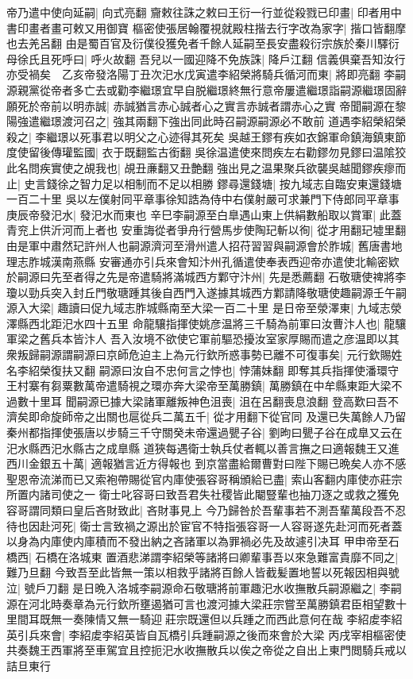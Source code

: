 帝乃遣中使向延嗣|{
	向式亮翻}
齎敕往誅之敕曰王衍一行並從殺戮已印畫|{
	印者用中書印畫者畫可敕又用御寶}
樞密使張居翰覆視就殿柱揩去行字改為家字|{
	揩口皆翻摩也去羌呂翻}
由是蜀百官及衍僕役獲免者千餘人延嗣至長安盡殺衍宗族於秦川驛衍母徐氏且死呼曰|{
	呼火故翻}
吾兒以一國迎降不免族誅|{
	降戶江翻}
信義俱棄吾知汝行亦受禍矣　乙亥帝發洛陽丁丑次汜水戊寅遣李紹榮將騎兵循河而東|{
	將即亮翻}
李嗣源親黨從帝者多亡去或勸李繼璟宜早自脱繼璟終無行意帝屢遣繼璟詣嗣源繼璟固辭願死於帝前以明赤誠|{
	赤誠猶言赤心誠者心之實言赤誠者謂赤心之實}
帝聞嗣源在黎陽強遣繼璟渡河召之|{
	強其兩翻下強出同此時召嗣源嗣源必不敢前}
道遇李紹榮紹榮殺之|{
	李繼璟以死事君以明父之心迹得其死矣}
吳越王鏐有疾如衣錦軍命鎮海鎮東節度使留後傳瓘監國|{
	衣于既翻監古銜翻}
吳徐温遣使來問疾左右勸鏐勿見鏐曰温隂狡此名問疾實使之覘我也|{
	覘丑亷翻又丑艶翻}
強出見之温果聚兵欲襲吳越聞鏐疾瘳而止|{
	史言錢徐之智力足以相制而不足以相勝}
鏐尋還錢塘|{
	按九域志自臨安東還錢塘一百二十里}
吳以左僕射同平章事徐知誥為侍中右僕射嚴可求兼門下侍郎同平章事　庚辰帝發汜水|{
	發汜水而東也}
辛巳李嗣源至白臯遇山東上供絹數船取以賞軍|{
	此蓋青兖上供沂河而上者也}
安重誨從者爭舟行營馬步使陶玘斬以徇|{
	從才用翻玘墟里翻}
由是軍中肅然玘許州人也嗣源濟河至滑州遣人招苻習習與嗣源會於胙城|{
	舊唐書地理志胙城漢南燕縣}
安審通亦引兵來會知汴州孔循遣使奉表西迎帝亦遣使北輸密欵於嗣源曰先至者得之先是帝遣騎將滿城西方鄴守汴州|{
	先是悉薦翻}
石敬瑭使禆將李瓊以勁兵突入封丘門敬瑭踵其後自西門入遂據其城西方鄴請降敬瑭使趣嗣源壬午嗣源入大梁|{
	趣讀曰促九域志胙城縣南至大梁一百二十里}
是日帝至滎澤東|{
	九域志滎澤縣西北距汜水四十五里}
命龍驤指揮使姚彦温將三千騎為前軍曰汝曹汴人也|{
	龍驤軍梁之舊兵本皆汴人}
吾入汝境不欲使它軍前驅恐擾汝室家厚賜而遣之彦温即以其衆叛歸嗣源謂嗣源曰京師危迫主上為元行欽所惑事勢已離不可復事矣|{
	元行欽賜姓名李紹榮復扶又翻}
嗣源曰汝自不忠何言之悖也|{
	悖蒲妹翻}
即奪其兵指揮使潘環守王村寨有芻粟數萬帝遣騎視之環亦奔大梁帝至萬勝鎮|{
	萬勝鎮在中牟縣東距大梁不過數十里耳}
聞嗣源已據大梁諸軍離叛神色沮喪|{
	沮在呂翻喪息浪翻}
登高歎曰吾不濟矣即命旋師帝之出關也扈從兵二萬五千|{
	從才用翻下從官同}
及還已失萬餘人乃留秦州都指揮使張唐以步騎三千守關癸未帝還過甖子谷|{
	劉昫曰甖子谷在成臯又云在汜水縣西汜水縣古之成臯縣}
道狹每遇衛士執兵仗者輒以善言撫之曰適報魏王又進西川金銀五十萬|{
	適報猶言近方得報也}
到京當盡給爾曹對曰陛下賜已晩矣人亦不感聖恩帝流涕而已又索袍帶賜從官内庫使張容哥稱頒給已盡|{
	索山客翻内庫使亦莊宗所置内諸司使之一}
衛士叱容哥曰致吾君失社稷皆此閹豎輩也抽刀逐之或救之獲免容哥謂同類曰皇后吝財致此|{
	吝財事見上}
今乃歸咎於吾輩事若不測吾輩萬段吾不忍待也因赴河死|{
	衛士言致禍之源出於宦官不特指張容哥一人容哥遂先赴河而死者蓋以身為内庫使内庫積而不發出納之吝諸軍以為罪禍必先及故遽引决耳}
甲申帝至石橋西|{
	石橋在洛城東}
置酒悲涕謂李紹榮等諸將曰卿輩事吾以來急難富貴靡不同之|{
	難乃旦翻}
今致吾至此皆無一策以相救乎諸將百餘人皆截髪置地誓以死報因相與號泣|{
	號戶刀翻}
是日晩入洛城李嗣源命石敬瑭將前軍趣汜水收撫散兵嗣源繼之|{
	李嗣源在河北時奏章為元行欽所壅遏猶可言也渡河據大梁莊宗嘗至萬勝鎮君臣相望數十里間耳既無一奏陳情又無一騎迎莊宗既還但以兵踵之而西此意何在哉}
李紹䖍李紹英引兵來會|{
	李紹䖍李紹英皆自瓦橋引兵踵嗣源之後而來會於大梁}
丙戌宰相樞密使共奏魏王西軍將至車駕宜且控扼汜水收撫散兵以俟之帝從之自出上東門閲騎兵戒以詰旦東行

